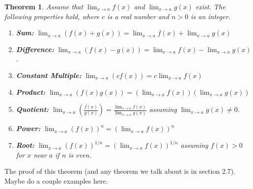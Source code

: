 \documentclass[12pt,reqno]{article}
\newtheorem{Theorem}{Theorem}
\theoremstyle{definition}
\begin{document}
\begin{Theorem}
	Assume that $\lim_{x \to a} f(x)$ and $\lim_{x \to a} g(x)$ exist. The following properties hold, where $c$ is a real number and $n > 0$ is an integer. 
	\begin{enumerate}
		\item \textbf{Sum:} $\lim_{x \to a} (f(x) + g(x)) = \lim_{x \to a} f(x) + \lim_{x\to a} g(x)$ 
		\item \textbf{Difference:} $\lim_{x \to a} (f(x) - g(x)) = \lim_{x \to a} f(x) - \lim_{x \to a} g(x)$. 
		\item \textbf{Constant Multiple:} $\lim_{x \to a} (c f(x)) = c \lim_{x \to a} f(x)$ 
		\item \textbf{Product:} $\lim_{x\to a} (f(x) g(x)) = (\lim_{x \to a} f(x) ) (\lim_{x \to a} g(x))$ 
		\item \textbf{Quotient:} $\lim_{x \to a} \left(\frac{f(x)}{g(x)} \right) = \frac{\lim_{x \to a} f(x)}{\lim_{x \to a} g(x)}$ assuming $\lim_{x \to a} g(x) \neq 0$. 
		\item \textbf{Power:} $\lim_{x \to a} (f(x))^n = (\lim_{x \to a} f(x))^n $
		\item \textbf{Root:} $\lim_{x\to a}(f(x))^{1/n} = (\lim_{x \to a} f(x))^{1/n}$ assuming $f(x) > 0$ for $x$ near $a$ if $n$ is even. 
	\end{enumerate}
\end{Theorem}

The proof of this theorem (and any theorem we talk about is in section 2.7). Maybe do a couple examples here.
\end{document}
